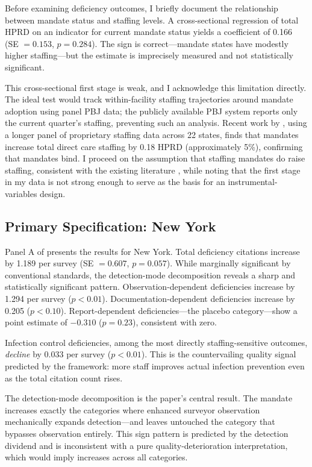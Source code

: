 \documentclass[12pt]{article}
\begin{document}
Before examining deficiency outcomes, I briefly document the relationship between mandate status and staffing levels. A cross-sectional regression of total HPRD on an indicator for current mandate status yields a coefficient of 0.166 (SE $= 0.153$, $p = 0.284$). The sign is correct---mandate states have modestly higher staffing---but the estimate is imprecisely measured and not statistically significant.

This cross-sectional first stage is weak, and I acknowledge this limitation directly. The ideal test would track within-facility staffing trajectories around mandate adoption using panel PBJ data; the publicly available PBJ system reports only the current quarter's staffing, preventing such an analysis. Recent work by \citet{werner2026}, using a longer panel of proprietary staffing data across 22 states, finds that mandates increase total direct care staffing by 0.18 HPRD (approximately 5\%), confirming that mandates bind. I proceed on the assumption that staffing mandates do raise staffing, consistent with the existing literature \citep{bowblis2011, matsudaira2014, werner2026}, while noting that the first stage in my data is not strong enough to serve as the basis for an instrumental-variables design.

\subsection{Primary Specification: New York}



Panel A of  presents the results for New York. Total deficiency citations increase by 1.189 per survey (SE $= 0.607$, $p = 0.057$). While marginally significant by conventional standards, the detection-mode decomposition reveals a sharp and statistically significant pattern. Observation-dependent deficiencies increase by 1.294 per survey ($p < 0.01$). Documentation-dependent deficiencies increase by 0.205 ($p < 0.10$). Report-dependent deficiencies---the placebo category---show a point estimate of $-0.310$ ($p = 0.23$), consistent with zero.

Infection control deficiencies, among the most directly staffing-sensitive outcomes, \textit{decline} by 0.033 per survey ($p < 0.01$). This is the countervailing quality signal predicted by the framework: more staff improves actual infection prevention even as the total citation count rises.

The detection-mode decomposition is the paper's central result. The mandate increases exactly the categories where enhanced surveyor observation mechanically expands detection---and leaves untouched the category that bypasses observation entirely. This sign pattern is predicted by the detection dividend and is inconsistent with a pure quality-deterioration interpretation, which would imply increases across all categories.
\end{document}
